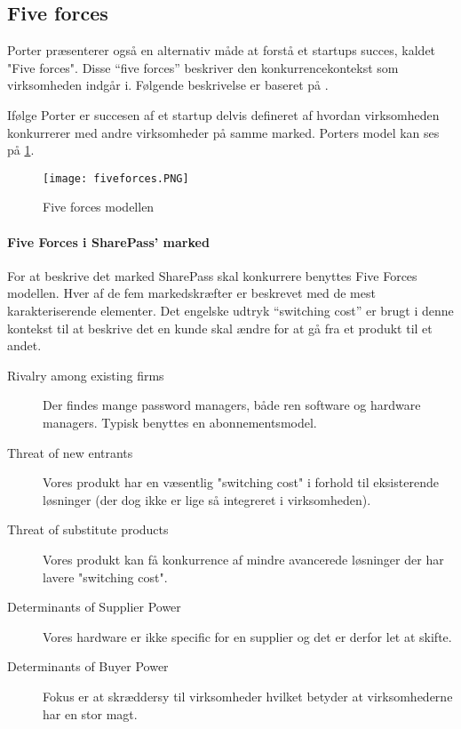 \subsection{Five forces}
 Porter præsenterer også en alternativ måde at forstå et startups succes, kaldet "Five forces".
 Disse ``five forces'' beskriver den konkurrencekontekst som virksomheden indgår i.
 Følgende beskrivelse er baseret på \citet[p.~16]{rose2012software}.

 Ifølge Porter er succesen af et startup delvis defineret af hvordan virksomheden konkurrerer med andre virksomheder på samme marked.
 Porters model kan ses på \cref{fiveforces}.

\begin{figure}[H]
	\texttt{[image: fiveforces.PNG]}
	\caption{Five forces modellen}
	\label{fiveforces}
\end{figure}

\paragraph{Five Forces i SharePass' marked}
\label{par:five_forces_i_sharepass_marked}

For at beskrive det marked SharePass skal konkurrere benyttes Five Forces modellen. 
Hver af de fem markedskræfter er beskrevet med de mest karakteriserende elementer.
Det engelske udtryk ``switching cost'' er brugt i denne kontekst til at beskrive det en kunde skal ændre for at gå fra et produkt til et andet.

\begin{description}
	\item[Rivalry among existing firms] Der findes mange password managers, både ren software og hardware managers. Typisk benyttes en abonnementsmodel.
	\item[Threat of new entrants] Vores produkt har en væsentlig "switching cost" i forhold til eksisterende løsninger (der dog ikke er lige så integreret i virksomheden). 
	\item [Threat of substitute products] Vores produkt kan få konkurrence af mindre avancerede løsninger der har lavere "switching cost".
	\item [Determinants of Supplier Power] Vores hardware er ikke specific for en supplier og det er derfor let at skifte. 
	\item [Determinants of Buyer Power] Fokus er at skræddersy til virksomheder hvilket betyder at virksomhederne har en stor magt.
\end{description}
